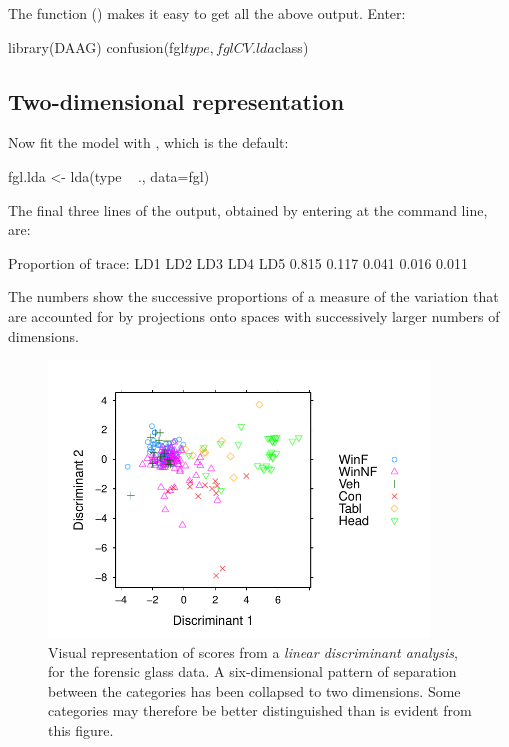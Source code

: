 The function  () makes it easy to
get all the above output.  Enter:
\begin{Schunk}
\begin{Sinput}
library(DAAG)
confusion(fgl$type, fglCV.lda$class)
\end{Sinput}
\end{Schunk}

\subsection*{Two-dimensional representation}

Now fit the model with , which is the default:
\begin{Schunk}
\begin{Sinput}
fgl.lda <- lda(type ~ ., data=fgl)
\end{Sinput}
\end{Schunk}
The final three lines of the output, obtained by entering
 at the command line, are:
\begin{Schunk}
\begin{Soutput}
Proportion of trace:
  LD1   LD2   LD3   LD4   LD5
0.815 0.117 0.041 0.016 0.011
\end{Soutput}
\end{Schunk}
The numbers 
show the successive proportions of a measure of the
variation that are accounted for by projections onto spaces with
successively larger numbers of dimensions.  


\begin{figure}
\begin{Schunk}


\centerline{\includegraphics[width=0.9\textwidth]{figs/9-fgl-scores2D-1} }

\end{Schunk}
\caption{Visual representation of scores from a
  {\em linear discriminant analysis}, for the forensic glass data.  A
  six-dimensional pattern of separation between the categories has
  been collapsed to two dimensions.  Some categories may therefore
be better distinguished than is evident from this figure.\label{fig:fgl}}
\end{figure}

